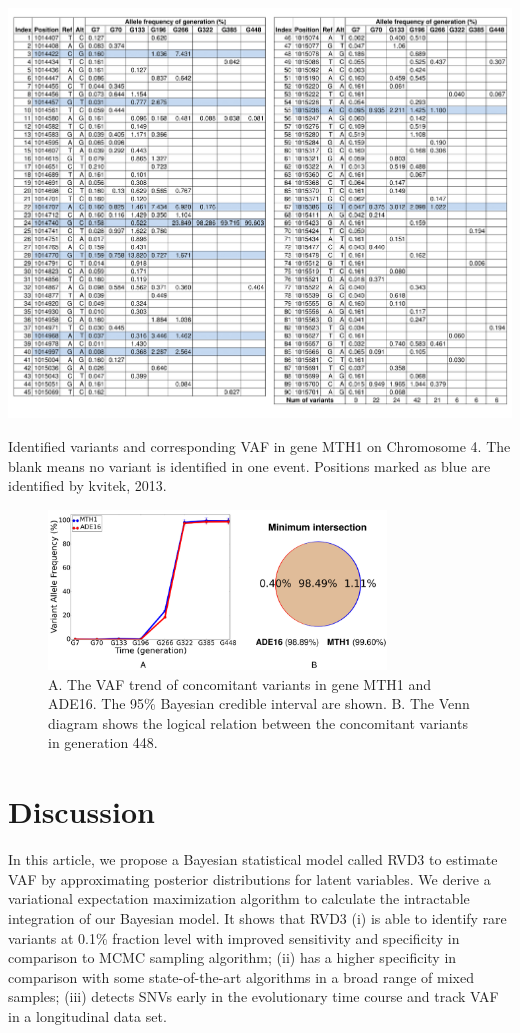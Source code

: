 \documentclass[11pt,reqno]{amsart}
\begin{document}
\begin{table}[htbp]
\centering
\includegraphics[width=1.0\textwidth]{tables/mutations_MTH1.png}
\caption{Identified variants and corresponding VAF in gene MTH1 on Chromosome 4.
The blank means no variant is identified in one event.
Positions marked as blue are identified by kvitek, 2013.}
\label{tbl:mutations}
\end{table}
\begin{figure}[htbp]
\centering
\includegraphics[width=0.8\textwidth]{figs/concomitant_figure.png}
\caption{A. The VAF trend of concomitant variants in gene MTH1 and ADE16.
The 95\% Bayesian credible interval are shown.
B. The Venn diagram shows the logical relation between the concomitant variants in generation 448.}
\label{tbl:concomitant}
\end{figure}


\section{Discussion}
In this article, we propose a Bayesian statistical model called RVD3 to estimate VAF by approximating posterior distributions for latent variables.
We derive a variational expectation maximization algorithm to calculate the intractable integration of our Bayesian model.
It shows that RVD3
(i) is able to identify rare variants at 0.1\% fraction level with improved sensitivity and specificity in comparison to MCMC sampling algorithm;
(ii) has a higher specificity in comparison with some state-of-the-art algorithms in a broad range of mixed samples;
(iii) detects SNVs early in the evolutionary time course and track VAF in a longitudinal data set.
\end{document}

